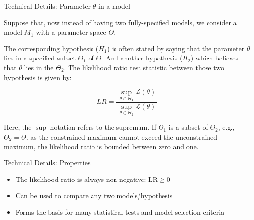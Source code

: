 \begin{frame}{Technical Details: Parameter $\theta$ in a model}

Suppose that, now instead of having two fully-specified models, we consider a model $M_1$ with a parameter space $\Theta$. 

The corresponding hypothesis ($H_1$) is often stated by saying that the parameter $\theta$ lies in a specified subset $\Theta_1$ of $\Theta$. And another hypothesis ($H_2$) which believes that $\theta$ lies in the $\Theta_2$. The likelihood ratio test statistic between those two hypothesis is given by:

$$
LR = \frac {~\sup_{\theta \in \Theta_1}{\mathcal{L}}(\theta)~}{~\sup_{\theta \in \Theta_2}{\mathcal{L}}(\theta)~}
$$

Here, the $\sup$ notation refers to the supremum. If $\Theta_1$ is a subset of $\Theta_2$, e.g., $\Theta_2 = \Theta$, as the constrained maximum cannot exceed the unconstrained maximum, the likelihood ratio is bounded between zero and one. 

\end{frame}

\begin{frame}{Technical Details: Properties}
\begin{itemize}
\item The likelihood ratio is always non-negative: $\text{LR} \geq 0$
\item Can be used to compare any two models/hypothesis
\item Forms the basis for many statistical tests and model selection criteria
\end{itemize}
\end{frame}

